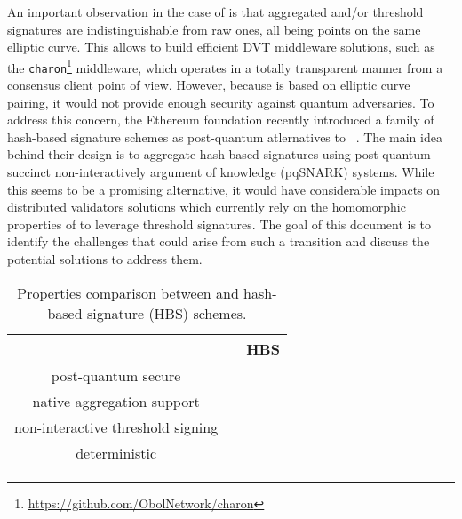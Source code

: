 An important observation in the case of \BLS is that aggregated and/or threshold \BLS signatures are indistinguishable from raw ones, all being points on the same elliptic curve.
This allows to build efficient DVT middleware solutions, such as the \texttt{charon}\footnote{\url{https://github.com/ObolNetwork/charon}} middleware, which operates in a totally transparent manner from a consensus client point of view.
However, because \BLS is based on elliptic curve pairing, it would not provide enough security against quantum adversaries.
To address this concern, the Ethereum foundation recently introduced a family of hash-based signature schemes as post-quantum atlernatives to \BLS~\cite{cryptoeprint:2025/055}.
The main idea behind their design is to aggregate hash-based signatures using post-quantum succinct non-interactively argument of knowledge (pqSNARK) systems. %
While this seems to be a promising alternative, it would have considerable impacts on distributed validators solutions which currently rely on the homomorphic properties of \BLS to leverage threshold signatures.
The goal of this document is to identify the challenges that could arise from such a transition and discuss the potential solutions to address them.


\renewcommand\arraystretch{1.25}
\begin{table}[h]
	\centering 
	\begin{tabular}{ccc}
		\toprule
    		& \BLS & HBS \\
    		\midrule
    		post-quantum secure & \xmark & \cmark \\
    		native aggregation support & \cmark  & \xmark \\
    		non-interactive threshold signing & \cmark  & \xmark\\
    		deterministic & \cmark & \xmark\\
    		\bottomrule
	\end{tabular}
	\caption{Properties comparison between \BLS and hash-based signature (HBS) schemes.\label{tab:bls_vs_hbs}}
\end{table}